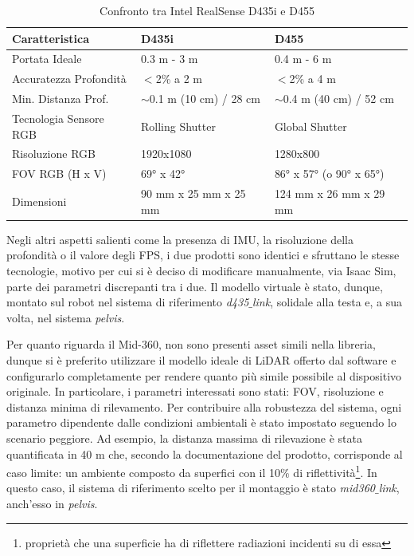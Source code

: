 \begin{table}[h]
    \centering
    \begin{tabular}{|l|l|l|}
    \hline
    \textbf{Caratteristica}                 & \textbf{D435i} & \textbf{D455} \\   \hline
    Portata Ideale                           & 0.3 m - 3 m                   & 0.4 m - 6 m                  \\ \hline
    Accuratezza Profondità                   & $<$2\% a 2 m                    & $<$2\% a 4 m                   \\ \hline
    Min. Distanza Prof.                      & $\sim$0.1 m (10 cm) / 28 cm & $\sim$0.4 m (40 cm) / 52 cm \\ 
    \hline
    Tecnologia Sensore RGB                   & Rolling Shutter               & Global Shutter               \\ \hline
    Risoluzione RGB                          & 1920x1080                     & 1280x800                     \\  \hline
    FOV RGB (H x V)                          & 69° x 42°                     & 86° x 57° (o 90° x 65°)      \\   \hline
    Dimensioni                               & 90 mm x 25 mm x 25 mm         & 124 mm x 26 mm x 29 mm       \\ \hline
    \end{tabular}
    \caption{Confronto tra Intel RealSense D435i e D455}
    \label{tab:realsense_comparison}
\end{table}

Negli altri aspetti salienti come la presenza di IMU, la risoluzione della profondità o il valore degli FPS, i due prodotti sono identici e sfruttano le stesse tecnologie, motivo per cui si è deciso di modificare manualmente, via Isaac Sim, parte dei parametri discrepanti tra i due. Il modello virtuale è stato, dunque, montato sul robot nel sistema di riferimento \textit{d435$\_$link}, solidale alla testa e, a sua volta, nel sistema \textit{pelvis}. 

Per quanto riguarda il Mid-360, non sono presenti asset simili nella libreria, dunque si è preferito utilizzare il modello ideale di LiDAR offerto dal software e configurarlo completamente per rendere quanto più simile possibile al dispositivo originale. In particolare, i parametri interessati sono stati: FOV, risoluzione e distanza minima di rilevamento. Per contribuire alla robustezza del sistema, ogni parametro dipendente dalle condizioni ambientali è stato impostato seguendo lo scenario peggiore. Ad esempio, la distanza massima di rilevazione è stata quantificata in 40 m che, secondo la documentazione del prodotto, corrisponde al caso limite: un ambiente composto da superfici con il 10$\%$ di riflettività\footnote{proprietà che una superficie ha di riflettere radiazioni incidenti su di essa}.  In questo caso, il sistema di riferimento scelto per il montaggio è stato \textit{mid360$\_$link}, anch'esso in \textit{pelvis}.

